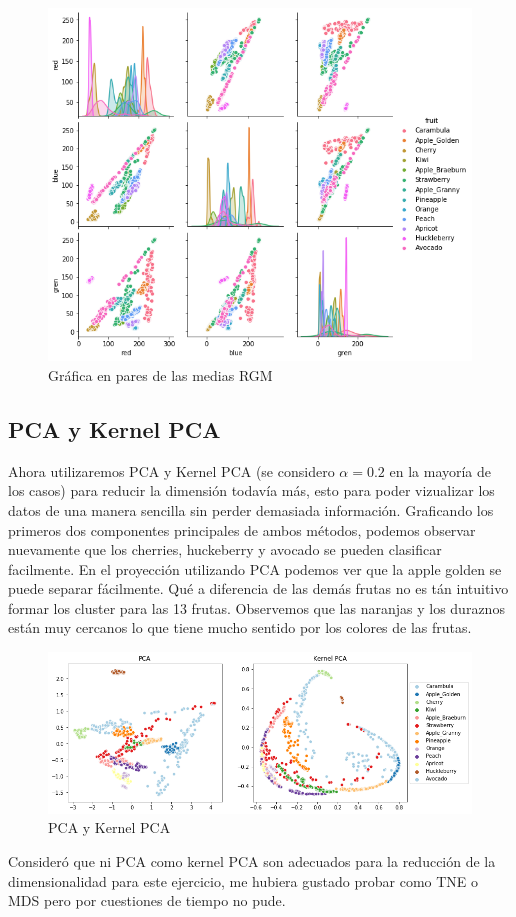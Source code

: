 \documentclass[paper=letter, fontsize=11pt]{scrartcl}
\numberwithin{equation}{section} %
\numberwithin{figure}{section} %
\numberwithin{table}{section} %
\begin{document}
\begin{figure}[H]
    \centering
    \includegraphics[scale=0.7]{figure/pairplot.png}
    \caption{Gráfica en pares de las medias RGM}
    \label{fig:pairplot}
\end{figure}

\subsection{PCA y Kernel PCA}
Ahora utilizaremos PCA y Kernel PCA (se considero $\alpha=0.2$ en la mayoría de los casos) para reducir la dimensión todavía más, esto para poder vizualizar los datos de una manera sencilla sin perder demasiada información. Graficando los primeros dos componentes principales de ambos métodos, podemos observar nuevamente que los cherries, huckeberry y avocado se pueden clasificar facilmente. En el proyección utilizando PCA podemos ver que la apple golden se puede separar fácilmente. Qué a diferencia de las demás frutas no es tán intuitivo formar los cluster para las 13 frutas.  Observemos que las naranjas y los duraznos están muy cercanos lo que tiene mucho sentido por los colores de las frutas.

\begin{figure}[H]
    \centering
    \includegraphics[scale=.6]{figure/pca_rgb.png}
    \caption{PCA y Kernel PCA}
    \label{fig:pca_rgb}
\end{figure}
Consideró que ni PCA como kernel PCA son adecuados para la reducción de la dimensionalidad para este ejercicio, me hubiera gustado probar como TNE o MDS pero por cuestiones de tiempo no pude. 
\end{document}

